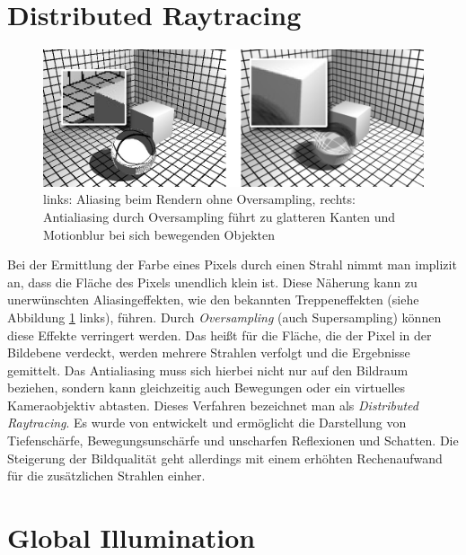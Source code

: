 \section{Distributed Raytracing}
\begin{figure}
\includegraphics[width=1.0\textwidth]{images/alias.png}
\caption[Unterdrückung von Aliasing-Effekten durch Oversampling]{links: Aliasing beim Rendern ohne Oversampling, rechts: Antialiasing durch Oversampling führt zu glatteren Kanten und Motionblur bei sich bewegenden Objekten}
\label{fig:aliasing}
\end{figure}

Bei der Ermittlung der Farbe eines Pixels durch einen Strahl nimmt man implizit an, dass die Fläche des Pixels unendlich klein ist. Diese Näherung kann zu unerwünschten Aliasingeffekten, wie den bekannten Treppeneffekten (siehe Abbildung \ref{fig:aliasing} links), führen.
Durch \textit{Oversampling} (auch Supersampling) können diese Effekte verringert werden. Das heißt für die Fläche, die der Pixel in der Bildebene verdeckt, werden mehrere Strahlen verfolgt und die Ergebnisse gemittelt.
Das Antialiasing muss sich hierbei nicht nur auf den Bildraum beziehen, sondern kann gleichzeitig auch Bewegungen oder ein virtuelles Kameraobjektiv abtasten. Dieses Verfahren bezeichnet man als \textit{Distributed Raytracing}. Es wurde von \cite{COOK84} entwickelt und ermöglicht die Darstellung von Tiefenschärfe, Bewegungsunschärfe und unscharfen Reflexionen und Schatten. Die Steigerung der Bildqualität geht allerdings mit einem erhöhten Rechenaufwand für die zusätzlichen Strahlen einher.

\section{Global Illumination}


